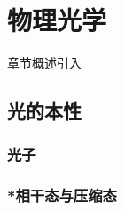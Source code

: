 \chapter{物理光学}\label{27}

章节概述引入

\section{光的本性}\label{27-1}

\subsection{光子}\label{27-1-1}

\subsection{*相干态与压缩态}\label{27-1-2}
